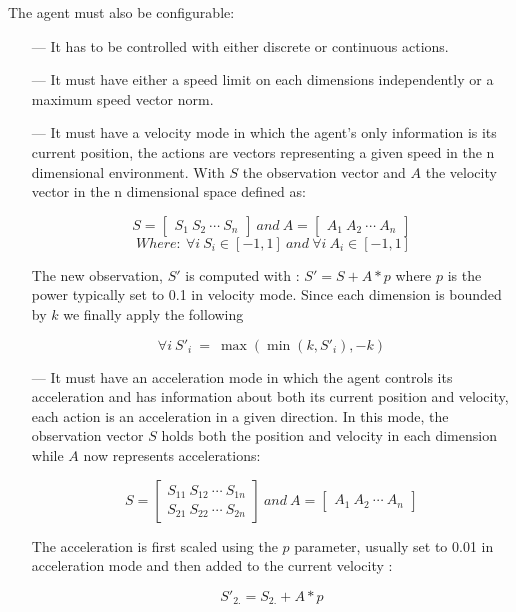 \documentclass{article}
\begin{document}
The agent must also be configurable:
\begin{itemize}
    \item[---] It has to be controlled with either discrete or continuous actions.
    \item[---] It must have either a speed limit on each dimensions independently or a maximum speed vector norm.
    \item[---] It must have a velocity mode in which the agent's only information is its current position, the actions are vectors representing a given speed in the n dimensional environment. With $S$ the observation vector and $A$ the velocity vector in the n dimensional space defined as:
    
    $$S = \begin{bmatrix} S_1\:S_2\:\cdots\:S_n\end{bmatrix}\:and\: A = \begin{bmatrix} A_1\:A_2\:\cdots\:A_n \end{bmatrix}$$
    $$\:Where:\: \forall i \: S_i \in [-1, 1] \:and\: \forall i \: A_i \in [-1, 1]$$
    
    The new observation, $S'$ is computed with : $S' = S + A * p$ where $p$ is the power typically set to 0.1 in velocity mode. Since each dimension is bounded by $k$ we finally apply the following
    
    $$\forall i \: S'_i \: = \: \max (\min (k, S'_i), -k)$$
   
    \item[---] It must have an acceleration mode in which the agent controls its acceleration and has information about both its current position and velocity, each action is an acceleration in a given direction.
    In this mode, the observation vector $S$ holds both the position and velocity in each dimension while $A$ now represents accelerations:
    
    $$S = \begin{bmatrix} S_{11}\:S_{12}\:\cdots\:S_{1n} \\ S_{21}\:S_{22}\:\cdots\:S_{2n}\end{bmatrix}\:and\:A = \begin{bmatrix} A_1\:A_2\:\cdots\:A_n \end{bmatrix}$$
    
    The acceleration is first scaled using the $p$ parameter, usually set to 0.01 in acceleration mode and then added to the current velocity :
    
    $$S'_{2.} = S_{2.} + A * p$$
    

\end{itemize}
\end{document}
